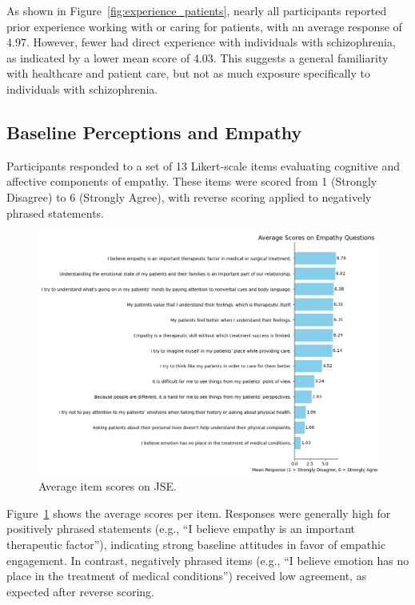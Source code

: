 As shown in Figure~\ref{fig:experience_patients}, nearly all participants reported prior experience working with or caring for patients, with an average response of 4.97. However, fewer had direct experience with individuals with schizophrenia, as indicated by a lower mean score of 4.03. This suggests a general familiarity with healthcare and patient care, but not as much exposure specifically to individuals with schizophrenia.

\subsection{Baseline Perceptions and Empathy}

Participants responded to a set of 13 Likert-scale items evaluating cognitive and affective components of empathy. These items were scored from 1 (Strongly Disagree) to 6 (Strongly Agree), with reverse scoring applied to negatively phrased statements.

\begin{figure}[H]
    \centering
    \includegraphics[width=\columnwidth]{../../Figures/avg-scores-pre.png}
    \caption{Average item scores on JSE.}
    \label{fig:avg_scores_pre}
\end{figure}

Figure~\ref{fig:avg_scores_pre} shows the average scores per item. Responses were generally high for positively phrased statements (e.g., “I believe empathy is an important therapeutic factor”), indicating strong baseline attitudes in favor of empathic engagement. In contrast, negatively phrased items (e.g., “I believe emotion has no place in the treatment of medical conditions”) received low agreement, as expected after reverse scoring.

